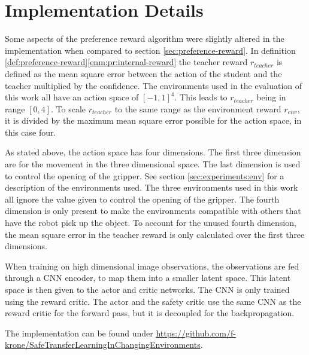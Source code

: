 \section{Implementation Details}
\label{sec:impl-details}

Some aspects of the preference reward algorithm were slightly altered in the implementation when compared to section \ref{sec:preference-reward}. In definition \ref{def:preference-reward}\ref{enm:pr:internal-reward} the teacher reward $r_{teacher}$ is defined as the mean square error between the action of the student and the teacher multiplied by the confidence. The environments used in the evaluation of this work all have an action space of $[-1,1]^4$. This leads to $r_{teacher}$ being in range $[0,4]$. To scale $r_{teacher}$ to the same range as the environment reward $r_{env}$, it is divided by the maximum mean square error possible for the action space, in this case four.

As stated above, the action space has four dimensions. The first three dimension are for the movement in the three dimensional space. The last dimension is used to control the opening of the gripper. See section \ref{sec:experiments:env} for a description of the environments used. The three environments used in this work all ignore the value given to control the opening of the gripper. The fourth dimension is only present to make the environments compatible with others that have the robot pick up the object. To account for the unused fourth dimension, the mean square error in the teacher reward is only calculated over the first three dimensions.

When training on high dimensional image observations, the observations are fed through a CNN encoder, to map them into a smaller latent space. This latent space is then given to the actor and critic networks. The CNN is only trained using the reward critic. The actor and the safety critic use the same CNN as the reward critic for the forward pass, but it is decoupled for the backpropagation.

The implementation can be found under \url{https://github.com/f-krone/SafeTransferLearningInChangingEnvironments}.
